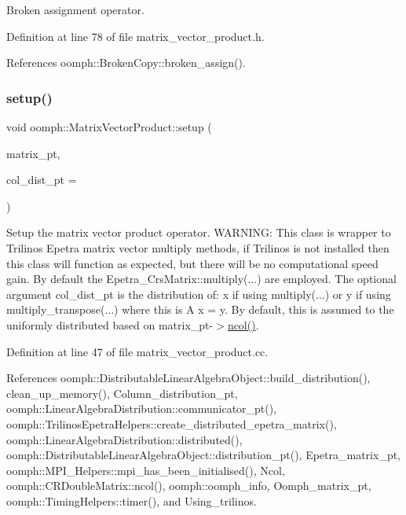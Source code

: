 Broken assignment operator. 



Definition at line 78 of file matrix\+\_\+vector\+\_\+product.\+h.



References oomph\+::\+Broken\+Copy\+::broken\+\_\+assign().

\mbox{\label{classoomph_1_1MatrixVectorProduct_aec74f9bdb65ee7ce86590e26a705f3e9}} 
\subsubsection{\texorpdfstring{setup()}{setup()}}
{\footnotesize\ttfamily void oomph\+::\+Matrix\+Vector\+Product\+::setup (\begin{DoxyParamCaption}\item[{\hyperlink{classoomph_1_1CRDoubleMatrix}{C\+R\+Double\+Matrix} $\ast$}]{matrix\+\_\+pt,  }\item[{const \hyperlink{classoomph_1_1LinearAlgebraDistribution}{Linear\+Algebra\+Distribution} $\ast$}]{col\+\_\+dist\+\_\+pt = {} }\end{DoxyParamCaption})}



Setup the matrix vector product operator. W\+A\+R\+N\+I\+NG\+: This class is wrapper to Trilinos Epetra matrix vector multiply methods, if Trilinos is not installed then this class will function as expected, but there will be no computational speed gain. By default the Epetra\+\_\+\+Crs\+Matrix\+::multiply(...) are employed. The optional argument col\+\_\+dist\+\_\+pt is the distribution of\+: x if using multiply(...) or y if using multiply\+\_\+transpose(...) where this is A x = y. By default, this is assumed to the uniformly distributed based on matrix\+\_\+pt-\/$>$\hyperlink{classoomph_1_1MatrixVectorProduct_ab50c3dc351cd11050a979d30e421836f}{ncol()}. 



Definition at line 47 of file matrix\+\_\+vector\+\_\+product.\+cc.



References oomph\+::\+Distributable\+Linear\+Algebra\+Object\+::build\+\_\+distribution(), clean\+\_\+up\+\_\+memory(), Column\+\_\+distribution\+\_\+pt, oomph\+::\+Linear\+Algebra\+Distribution\+::communicator\+\_\+pt(), oomph\+::\+Trilinos\+Epetra\+Helpers\+::create\+\_\+distributed\+\_\+epetra\+\_\+matrix(), oomph\+::\+Linear\+Algebra\+Distribution\+::distributed(), oomph\+::\+Distributable\+Linear\+Algebra\+Object\+::distribution\+\_\+pt(), Epetra\+\_\+matrix\+\_\+pt, oomph\+::\+M\+P\+I\+\_\+\+Helpers\+::mpi\+\_\+has\+\_\+been\+\_\+initialised(), Ncol, oomph\+::\+C\+R\+Double\+Matrix\+::ncol(), oomph\+::oomph\+\_\+info, Oomph\+\_\+matrix\+\_\+pt, oomph\+::\+Timing\+Helpers\+::timer(), and Using\+\_\+trilinos.



